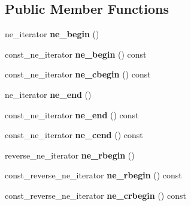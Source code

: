 \subsection*{Public Member Functions}
\begin{DoxyCompactItemize}
\item 
ne\+\_\+iterator {\bfseries ne\+\_\+begin} ()\hypertarget{classspp___1_1sparsegroup_a59e49c3535cbee5b90b1d8a2d2881866}{}\label{classspp___1_1sparsegroup_a59e49c3535cbee5b90b1d8a2d2881866}

\item 
const\+\_\+ne\+\_\+iterator {\bfseries ne\+\_\+begin} () const \hypertarget{classspp___1_1sparsegroup_a2244be39154c5629284d9a8bbc275cdc}{}\label{classspp___1_1sparsegroup_a2244be39154c5629284d9a8bbc275cdc}

\item 
const\+\_\+ne\+\_\+iterator {\bfseries ne\+\_\+cbegin} () const \hypertarget{classspp___1_1sparsegroup_ae5c6d7af78d6995b8c9446d172f3a3ce}{}\label{classspp___1_1sparsegroup_ae5c6d7af78d6995b8c9446d172f3a3ce}

\item 
ne\+\_\+iterator {\bfseries ne\+\_\+end} ()\hypertarget{classspp___1_1sparsegroup_a3256ebde0169752a01a5098f32725800}{}\label{classspp___1_1sparsegroup_a3256ebde0169752a01a5098f32725800}

\item 
const\+\_\+ne\+\_\+iterator {\bfseries ne\+\_\+end} () const \hypertarget{classspp___1_1sparsegroup_af56d53f8d7aa59bb213f0ec067866f24}{}\label{classspp___1_1sparsegroup_af56d53f8d7aa59bb213f0ec067866f24}

\item 
const\+\_\+ne\+\_\+iterator {\bfseries ne\+\_\+cend} () const \hypertarget{classspp___1_1sparsegroup_a9fd192a03e62de895c886dc446a426d0}{}\label{classspp___1_1sparsegroup_a9fd192a03e62de895c886dc446a426d0}

\item 
reverse\+\_\+ne\+\_\+iterator {\bfseries ne\+\_\+rbegin} ()\hypertarget{classspp___1_1sparsegroup_adb900a6a1ff14a1531e8a04ac5ba2bca}{}\label{classspp___1_1sparsegroup_adb900a6a1ff14a1531e8a04ac5ba2bca}

\item 
const\+\_\+reverse\+\_\+ne\+\_\+iterator {\bfseries ne\+\_\+rbegin} () const \hypertarget{classspp___1_1sparsegroup_a243a0be08b794fac22393d893756edfd}{}\label{classspp___1_1sparsegroup_a243a0be08b794fac22393d893756edfd}

\item 
const\+\_\+reverse\+\_\+ne\+\_\+iterator {\bfseries ne\+\_\+crbegin} () const \hypertarget{classspp___1_1sparsegroup_a1b5e38bc0efbf0128e946ee5c7b13b6e}{}\label{classspp___1_1sparsegroup_a1b5e38bc0efbf0128e946ee5c7b13b6e}


\end{DoxyCompactItemize}
